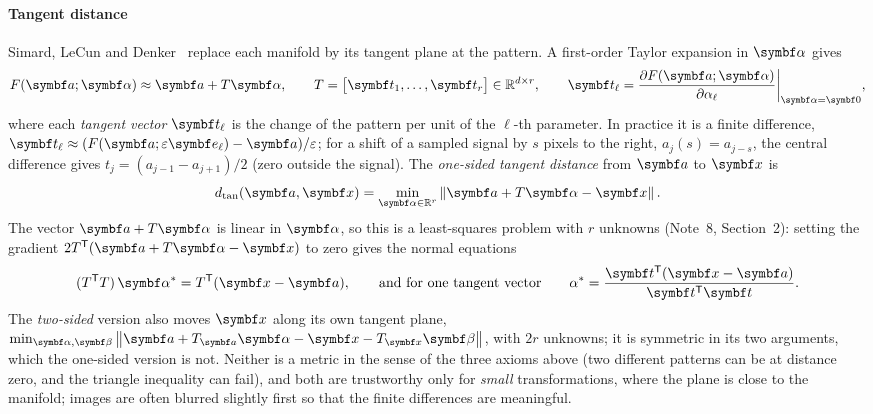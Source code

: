 \documentclass[11pt]{article}
\begin{document}
\paragraph{Tangent distance} Simard, LeCun and Denker~\cite{simard1993} replace each manifold by its tangent plane at
the pattern. A first-order Taylor expansion in $\vect{\alpha}$ gives
\[
  F(\vect{a}; \vect{\alpha}) \approx \vect{a} + T\vect{\alpha}, \qquad
  T = \big[\vect{t}_1, \dots, \vect{t}_r\big] \in \R^{d \times r}, \qquad
  \vect{t}_\ell = \frac{\partial F(\vect{a}; \vect{\alpha})}{\partial \alpha_\ell}\bigg|_{\vect{\alpha} = \vect{0}} ,
\]
where each \emph{tangent vector} $\vect{t}_\ell$ is the change of the pattern per unit of the $\ell$-th parameter. In
practice it is a finite difference, $\vect{t}_\ell \approx (F(\vect{a}; \varepsilon \vect{e}_\ell) - \vect{a})/\varepsilon$;
for a shift of a sampled signal by $s$ pixels to the right, $a_j(s) = a_{j - s}$, the central difference gives
$t_j = (a_{j-1} - a_{j+1})/2$ (zero outside the signal). The \emph{one-sided tangent distance} from $\vect{a}$ to
$\vect{x}$ is
\[
  d_{\mathrm{tan}}(\vect{a}, \x) = \min_{\vect{\alpha} \in \R^r} \norm{\vect{a} + T\vect{\alpha} - \x} .
\]
The vector $\vect{a} + T\vect{\alpha}$ is linear in $\vect{\alpha}$, so this is a least-squares problem with $r$
unknowns (Note~8, Section~2): setting the gradient $2T\T(\vect{a} + T\vect{\alpha} - \x)$ to zero gives the normal
equations
\[
  (T\T T)\, \vect{\alpha}^* = T\T (\x - \vect{a}), \qquad\text{and for one tangent vector}\qquad
  \alpha^* = \frac{\vect{t}\T(\x - \vect{a})}{\vect{t}\T\vect{t}} .
\]
The \emph{two-sided} version also moves $\x$ along its own tangent plane, $\min_{\vect{\alpha}, \vect{\beta}}
\norm{\vect{a} + T_{\vect{a}}\vect{\alpha} - \x - T_{\x}\vect{\beta}}$, with $2r$ unknowns; it is symmetric in its
two arguments, which the one-sided version is not. Neither is a metric in the sense of the three axioms above (two
different patterns can be at distance zero, and the triangle inequality can fail), and both are trustworthy only for \emph{small} transformations, where the plane is
close to the manifold; images are often blurred slightly first so that the finite differences are meaningful.
\end{document}
